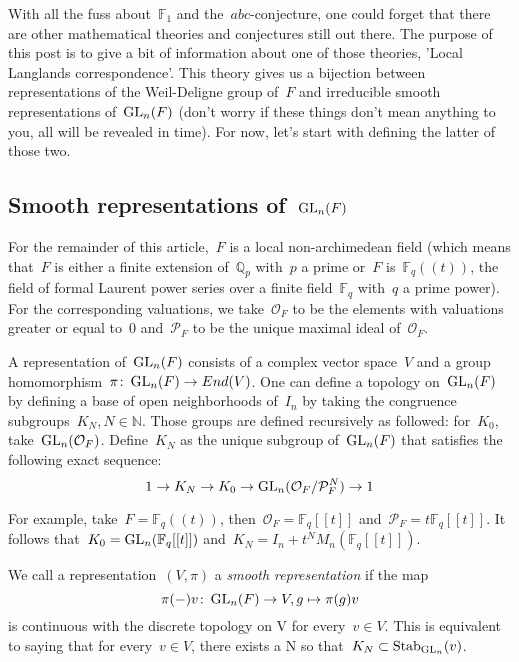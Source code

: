 With all the fuss about~$\mathbb{F}_1$ and the~$abc$-conjecture, one could forget that there are other mathematical theories and conjectures still out there. The purpose of this post is to give a bit of information about one of those theories, 'Local Langlands correspondence'. This theory gives us a bijection between representations of the Weil-Deligne group of~$F$ and irreducible smooth representations of~$\operatorname{GL}_n (F)$ (don't worry if these things don't mean anything to you, all will be revealed in time). For now, let's start with defining the latter of those two.

\subsection{Smooth representations of~$\operatorname{GL}_n(F)$}
For the remainder of this article,~$F$ is a local non-archimedean field (which means that~$F$ is either a finite extension of~$\mathbb{Q}_p$ with~$p$ a prime or~$F$ is~$\mathbb{F}_q (\!(t)\!)$, the field of formal Laurent power series over a finite field~$\mathbb{F}_q$ with~$q$ a prime power). For the corresponding valuations, we take~$\mathcal{O}_F$ to be the elements with valuations greater or equal to~$0$ and~$\mathcal{P}_F$ to be the unique maximal ideal of~$\mathcal{O}_F$.

A representation of~$\operatorname{GL}_n(F)$ consists of a complex vector space~$V$ and a group homomorphism~$\pi\colon\operatorname{GL}_n(F) \rightarrow End(V)$. One can define a topology on~$\operatorname{GL}_n(F)$ by defining a base of open neighborhoods of~$I_n$ by taking the congruence subgroups~$K_N, N \in \mathbb{N}$. Those groups are defined recursively as followed: for~$K_0$, take~$\operatorname{GL}_n (\mathcal{O}_F)$. Define~$K_N$ as the unique subgroup of~$\operatorname{GL}_n(F)$ that satisfies the following exact sequence:~$$ 1 \rightarrow K_N \rightarrow K_0 \rightarrow \operatorname{GL}_n(\mathcal{O}_F/\mathcal{P}_{F}^N)\rightarrow 1$$

For example, take~$F = \mathbb{F}_q (\!(t)\!)$, then~$\mathcal{O}_F = \mathbb{F}_q [[t]]$ and $\mathcal{P}_F = t \mathbb{F}_q [[t]]$. It follows that~$K_0 = \operatorname{GL}_n(\mathbb{F}_q [[t]])$ and~$K_N = I_n + t^N M_n(\mathbb{F}_q [[t]])$.

We call a representation~$(V,\pi)$ a \emph{smooth representation} if the map
\begin{equation}
  \pi(-)v\colon\operatorname{GL}_n(F) \rightarrow V, g \mapsto \pi(g)v 
\end{equation}
is continuous with the discrete topology on V for every~$v \in V$. This is equivalent to saying that for every~$v \in V$, there exists a N so that~$K_N \subset \operatorname{Stab}_{\operatorname{GL}_n} (v)$.

